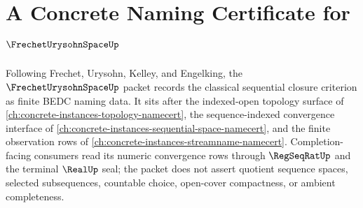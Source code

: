 \chapter{A Concrete Naming Certificate for $\FrechetUrysohnSpaceUp$}
\label{ch:concrete-instances-frechet-urysohn-space-namecert}

Following Frechet, Urysohn, Kelley, and Engelking, the $\FrechetUrysohnSpaceUp$ packet records the classical sequential closure criterion as finite BEDC naming data. It sits after the indexed-open topology surface of \autoref{ch:concrete-instances-topology-namecert}, the sequence-indexed convergence interface of \autoref{ch:concrete-instances-sequential-space-namecert}, and the finite observation rows of \autoref{ch:concrete-instances-streamname-namecert}. Completion-facing consumers read its numeric convergence rows through $\RegSeqRatUp$ and the terminal $\RealUp$ seal; the packet does not assert quotient sequence spaces, selected subsequences, countable choice, open-cover compactness, or ambient completeness.

